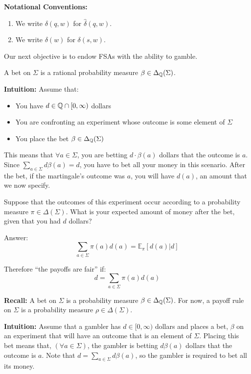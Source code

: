 \documentclass[../main.tex]{subfiles}
\begin{document}
\textbf{Notational Conventions:}
\begin{enumerate}
    \item We write $\delta(q, w)$ for $\hat{\delta}(q, w)$.
    \item We write $\delta(w)$ for $\delta(s, w)$.
\end{enumerate}

Our next objective is to endow FSAs with the ability to gamble.

\begin{defn}
A bet on $\Sigma$ is a rational probability measure $\beta \in \Delta_{\mathbb{Q}}(\Sigma)$.
\end{defn}

\textbf{Intuition:}
Assume that:
\begin{itemize}
    \item You have $d \in \mathbb{Q} \cap [0, \infty)$ dollars
    \item You are confronting an experiment whose outcome is some element of $\Sigma$
    \item You place the bet $\beta \in \Delta_{\mathbb{Q}}(\Sigma)$
\end{itemize}

This means that $\forall a \in \Sigma$, you are betting $d\cdot\beta(a)$ dollars
that the outcome is $a$. Since $\sum_{a \in \Sigma} d\beta(a) = d$, you have to
bet all your money in this scenario. After the bet, if the martingale's outcome
was $a$, you will have $d(a)$, an amount that we now specify.

Suppose that the outcomes of this experiment occur according to a probability
measure $\pi \in \Delta(\Sigma)$. What is your expected amount of money after
the bet, given that you had $d$ dollars?

Answer:
\begin{equation*}
    \sum_{a \in \Sigma} \pi(a)d(a) = \mathbb{E}_{\pi}[d(a) | d]
\end{equation*}

Therefore ``the payoffs are fair'' if:
\begin{equation*}
    d = \sum_{a \in \Sigma} \pi(a)d(a)
\end{equation*}

\textbf{Recall:}
A bet on $\Sigma$ is a probability measure $\beta \in \Delta_{\mathbb{Q}}(\Sigma)$.
For now, a payoff rule on $\Sigma$ is a probability measure $\rho \in \Delta(\Sigma)$.

\textbf{Intuition:}
    Assume that a gambler has $d \in [0, \infty)$ dollars and places a bet,
$\beta$ on an experiment that will have an outcome that is an element of $\Sigma$.
Placing this bet means that, $(\forall a \in \Sigma)$, the gambler is betting
$d\beta(a)$ dollars that the outcome is $a$. Note that $d = \sum_{a \in \Sigma} d\beta(a)$,
so the gambler is required to bet all its money.
\end{document}

